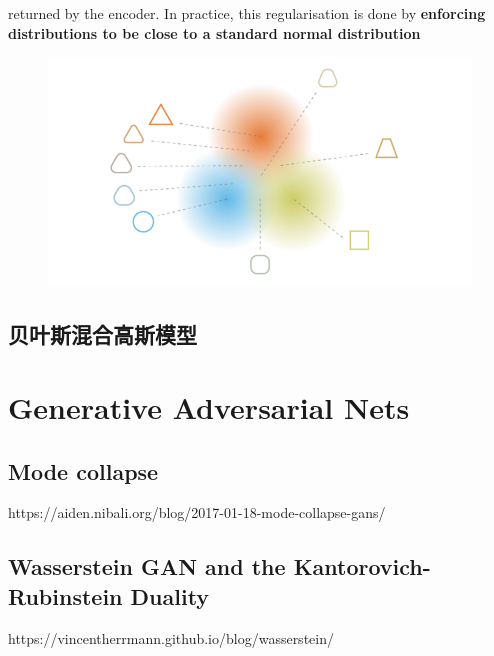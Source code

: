 returned by the encoder. In practice, this regularisation is done by \textbf{enforcing
distributions to be close to a standard normal distribution}
\begin{figure}[H]
    \centering
    \includegraphics[width=12cm]{images/vae_regularisation.png}
    \label{fig:regularised_distributions_vae}
\end{figure}

\subsection{}

\subsection{贝叶斯混合高斯模型}


\section{Generative Adversarial Nets}

\subsection{Mode collapse}
https://aiden.nibali.org/blog/2017-01-18-mode-collapse-gans/

\subsection{Wasserstein GAN and the Kantorovich-Rubinstein Duality}
https://vincentherrmann.github.io/blog/wasserstein/

